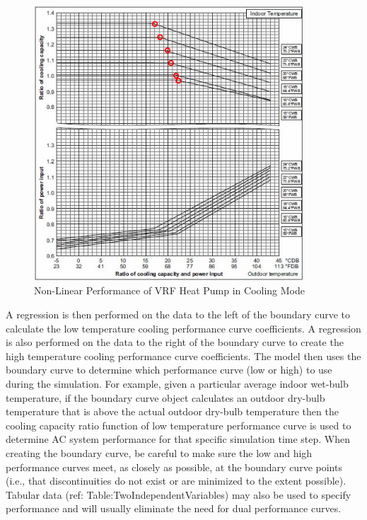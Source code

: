 \begin{figure}[hbtp] %
\centering
\includegraphics[width=0.9\textwidth, height=0.9\textheight, keepaspectratio=true]{media/image5340.png}
\caption{Non-Linear Performance of VRF Heat Pump in Cooling Mode \label{fig:non-linear-performance-of-vrf-heat-pump-in-cooling-mode}}
\end{figure}

A regression is then performed on the data to the left of the boundary curve to calculate the low temperature cooling performance curve coefficients. A regression is also performed on the data to the right of the boundary curve to create the high temperature cooling performance curve coefficients. The model then uses the boundary curve to determine which performance curve (low or high) to use during the simulation. For example, given a particular average indoor wet-bulb temperature, if the boundary curve object calculates an outdoor dry-bulb temperature that is above the actual outdoor dry-bulb temperature then the cooling capacity ratio function of low temperature performance curve is used to determine AC system performance for that specific simulation time step. When creating the boundary curve, be careful to make sure the low and high performance curves meet, as closely as possible, at the boundary curve points (i.e., that discontinuities do not exist or are minimized to the extent possible). Tabular data (ref: Table:TwoIndependentVariables) may also be used to specify performance and will usually eliminate the need for dual performance curves.

